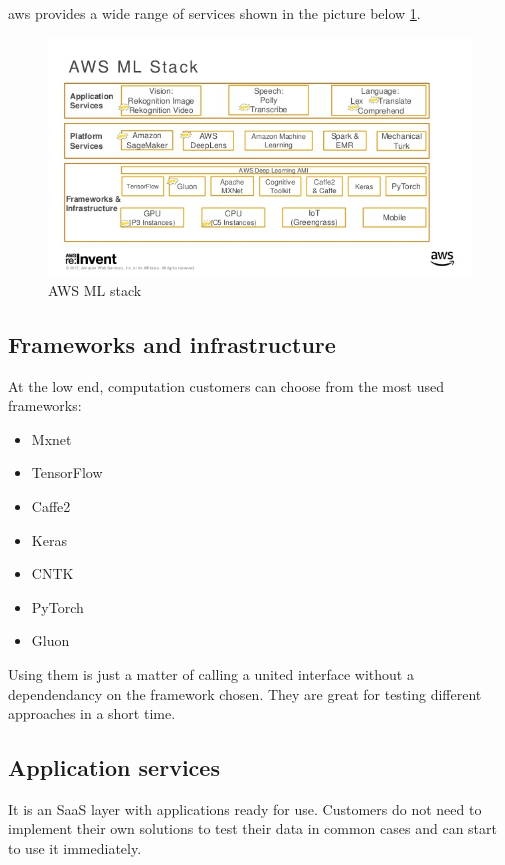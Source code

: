 \documentclass[thesis=M,english]{FITthesis}[2012/06/26]
\begin{document}
\acrshort{aws} provides a wide range of services shown in the picture below \ref{fig:ml_aws_sagemaker_stack}.

\begin{figure}[h!]\centering
	\includegraphics[width=1\textwidth]{pictures/ml_aws_sagemaker_stack}
	\caption{AWS ML stack \cite{ml_aws}}\label{fig:ml_aws_sagemaker_stack}
\end{figure}

\subsection{Frameworks and infrastructure}

At the low end, computation customers can choose from the most used frameworks:
\begin{itemize}[nosep]
	\item Mxnet 
	\item TensorFlow 
	\item Caffe2
	\item Keras
	\item CNTK
	\item PyTorch
	\item Gluon
\end{itemize}

Using them is just a matter of calling a united interface without a dependendancy on the framework chosen. They are great for testing different approaches in a short time.

\subsection{Application services}

It is an SaaS layer with applications ready for use. Customers do not need to implement their own solutions to test their data in common cases and can start to use it immediately.
\end{document}
